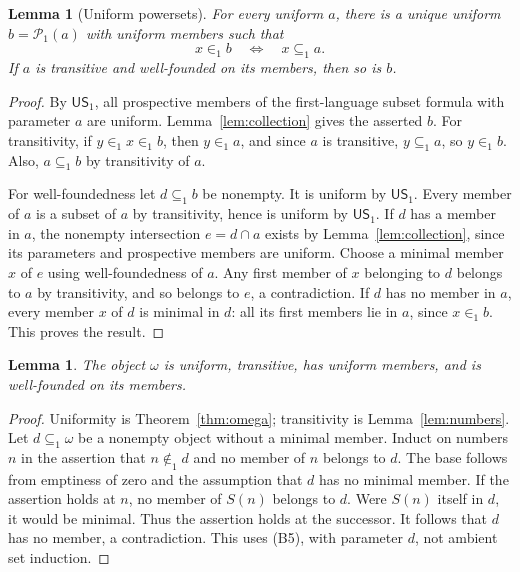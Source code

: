 \documentclass[11pt,a4paper]{article}
\numberwithin{equation}{section}
\newtheorem{lemma}[theorem]{Lemma}
\theoremstyle{definition}
\theoremstyle{remark}
\newcommand{\US}{\mathsf{US}_1}
\newcommand{\Pow}{\mathcal P_1}
\newcommand{\subone}{\subseteq_1}
\newcommand{\extone}{\in_1}
\begin{document}
\begin{lemma}[Uniform powersets]\label{lem:powerset}
For every uniform $a$, there is a unique uniform $b=\Pow(a)$ with uniform members such that
\[x\extone b\quad\Longleftrightarrow\quad x\subone a.\]
If $a$ is transitive and well-founded on its members, then so is $b$.
\end{lemma}
\begin{proof}
By $\US$, all prospective members of the first-language subset formula with parameter $a$ are uniform. Lemma~\ref{lem:collection} gives the asserted $b$. For transitivity, if $y\extone x\extone b$, then $y\extone a$, and since $a$ is transitive, $y\subone a$, so $y\extone b$. Also, $a\subone b$ by transitivity of $a$.

For well-foundedness let $d\subone b$ be nonempty. It is uniform by $\US$. Every member of $a$ is a subset of $a$ by transitivity, hence is uniform by $\US$. If $d$ has a member in $a$, the nonempty intersection $e=d\cap a$ exists by Lemma~\ref{lem:collection}, since its parameters and prospective members are uniform. Choose a minimal member $x$ of $e$ using well-foundedness of $a$. Any first member of $x$ belonging to $d$ belongs to $a$ by transitivity, and so belongs to $e$, a contradiction. If $d$ has no member in $a$, every member $x$ of $d$ is minimal in $d$: all its first members lie in $a$, since $x\extone b$. This proves the result.
\end{proof}

\begin{lemma}\label{lem:omega-good}
The object $\omega$ is uniform, transitive, has uniform members, and is well-founded on its members.
\end{lemma}
\begin{proof}
Uniformity is Theorem~\ref{thm:omega}; transitivity is Lemma~\ref{lem:numbers}. Let $d\subone\omega$ be a nonempty object without a minimal member. Induct on numbers $n$ in the assertion that $n\notin_1 d$ and no member of $n$ belongs to $d$. The base follows from emptiness of zero and the assumption that $d$ has no minimal member. If the assertion holds at $n$, no member of $S(n)$ belongs to $d$. Were $S(n)$ itself in $d$, it would be minimal. Thus the assertion holds at the successor. It follows that $d$ has no member, a contradiction. This uses (B5), with parameter $d$, not ambient set induction.
\end{proof}
\end{document}
